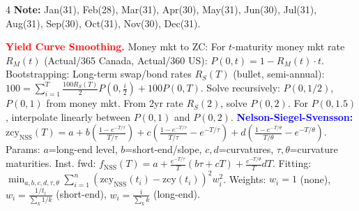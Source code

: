 \documentclass[landscape]{article}
\begin{document}
\begin{multicols}{4}
\textbf{Note:} Jan(31), Feb(28), Mar(31), Apr(30), May(31), Jun(30), Jul(31), Aug(31), Sep(30), Oct(31), Nov(30), Dec(31).

\textcolor{red}{\textbf{Yield Curve Smoothing.}}
Money mkt to ZC: For $t$-maturity money mkt rate $R_M(t)$ (Actual/365 Canada, Actual/360 US): $P(0,t)=1-R_M(t)\cdot t$.
Bootstrapping: Long-term swap/bond rates $R_S(T)$ (bullet, semi-annual): $100=\sum_{i=1}^T\frac{100R_S(T)}{2}P(0,\frac{i}{2})+100P(0,T)$. Solve recursively: $P(0,1/2)$, $P(0,1)$ from money mkt. From 2yr rate $R_S(2)$, solve $P(0,2)$. For $P(0,1.5)$, interpolate linearly between $P(0,1)$ and $P(0,2)$.
\textcolor{blue}{\textbf{Nelson-Siegel-Svensson:}} $\text{zcy}_{\text{NSS}}(T)=a+b(\frac{1-e^{-T/\tau}}{T/\tau})+c(\frac{1-e^{-T/\tau}}{T/\tau}-e^{-T/\tau})+d(\frac{1-e^{-T/\theta}}{T/\theta}-e^{-T/\theta})$. Params: $a$=long-end level, $b$=short-end/slope, $c,d$=curvatures, $\tau,\theta$=curvature maturities. Inst. fwd: $f_{\text{NSS}}(T)=a+\frac{e^{-T/\tau}}{T}(b\tau+cT)+\frac{e^{-T/\theta}}{T}dT$. Fitting: $\min_{a,b,c,d,\tau,\theta}\sum_{i=1}^n(\text{zcy}_{\text{NSS}}(t_i)-\text{zcy}(t_i))^2w_i^2$. Weights: $w_i=1$ (none), $w_i=\frac{1/t_i}{\sum_k 1/k}$ (short-end), $w_i=\frac{i}{\sum_k k}$ (long-end).


\end{multicols}
\end{document}
